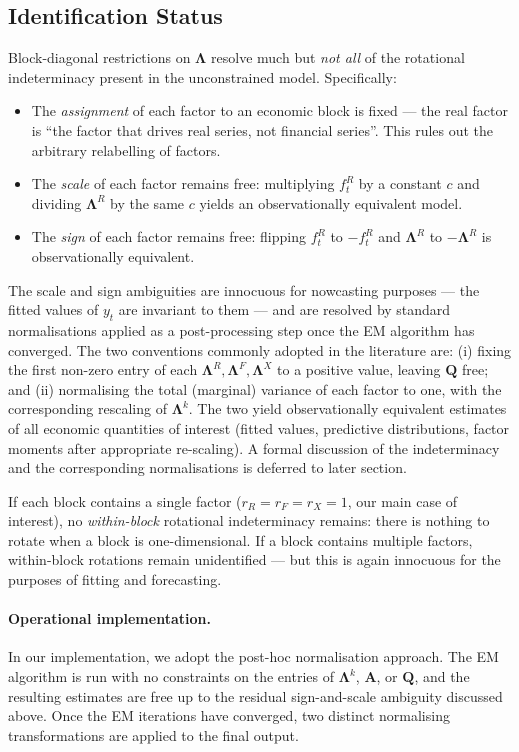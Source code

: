 \documentclass[11pt, a4paper, oneside]{article}
\newcommand{\mL}{\boldsymbol{\Lambda}}
\begin{document}
\subsection{Identification Status}
\label{subsec:block-identification}

Block-diagonal restrictions on $\mL$ resolve much but
\emph{not all} of the rotational indeterminacy present in the
unconstrained model. Specifically:
\begin{itemize}[leftmargin=1.5em, itemsep=3pt]
    \item The \emph{assignment} of each factor to an economic block
          is fixed — the real factor is ``the factor that drives real
          series, not financial series''. This rules out the arbitrary
          relabelling of factors.
    \item The \emph{scale} of each factor remains free: multiplying
          $f^R_t$ by a constant $c$ and dividing $\mL^R$
          by the same $c$ yields an observationally equivalent model.
    \item The \emph{sign} of each factor remains free: flipping $f^R_t$
          to $-f^R_t$ and $\mL^R$ to $-\mL^R$
          is observationally equivalent.
\end{itemize}
The scale and sign ambiguities are innocuous for nowcasting purposes
— the fitted values of $y_t$ are invariant to them — and are
resolved by standard normalisations applied as a post-processing step
once the EM algorithm has converged. The two conventions commonly
adopted in the literature are: (i) fixing the first non-zero entry of
each $\mL^R, \mL^F, \mL^X$ to a positive value, leaving $\mathbf{Q}$
free; and (ii) normalising the total (marginal) variance of each
factor to one, with the corresponding rescaling of $\mL^k$. The two yield
observationally equivalent estimates of all economic quantities of
interest (fitted values, predictive distributions, factor moments
after appropriate re-scaling). A formal discussion of the
indeterminacy and the corresponding normalisations is deferred to
later section.

If each block contains a single factor ($r_R = r_F = r_X = 1$, our
main case of interest), no \emph{within-block} rotational
indeterminacy remains: there is nothing to rotate when a block is
one-dimensional. If a block contains multiple factors, within-block
rotations remain unidentified — but this is again innocuous for the
purposes of fitting and forecasting.

\paragraph{Operational implementation.}
In our implementation, we adopt the post-hoc normalisation approach.
The EM algorithm is run with no constraints on the entries of
$\mL^k$, $\mathbf{A}$, or $\mathbf{Q}$, and the resulting estimates
are free up to the residual sign-and-scale ambiguity discussed
above. Once the EM iterations have converged, two distinct
normalising transformations are applied to the final output.
\end{document}
